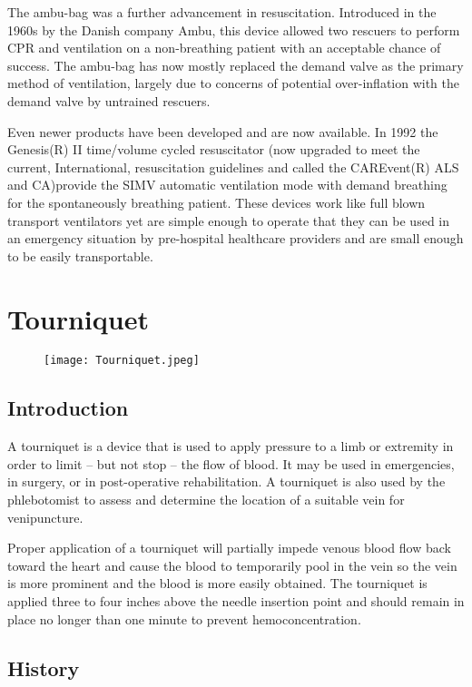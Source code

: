 \documentclass[12pt]{article}
\begin{document}
The ambu-bag was a further advancement in resuscitation. Introduced in the 1960s by the Danish company Ambu, this device allowed two rescuers to perform CPR and ventilation on a non-breathing patient with an acceptable chance of success. The ambu-bag has now mostly replaced the demand valve as the primary method of ventilation, largely due to concerns of potential over-inflation with the demand valve by untrained rescuers.


Even newer products have been developed and are now available. In 1992 the Genesis(R) II time/volume cycled resuscitator (now upgraded to meet the current, International, resuscitation guidelines and called the CAREvent(R) ALS and CA)provide the SIMV automatic ventilation mode with demand breathing for the spontaneously breathing patient. These devices work like full blown transport ventilators yet are simple enough to operate that they can be used in an emergency situation by pre-hospital healthcare providers and are small enough to be easily transportable.


\section{Tourniquet}

\begin{figure}[h]
\texttt{[image: Tourniquet.jpeg]}
\centering
\end{figure}

\subsection{Introduction}

A tourniquet is a device that is used to apply pressure to a limb or extremity in order to limit – but not stop – the flow of blood. It may be used in emergencies, in surgery, or in post-operative rehabilitation. A tourniquet is also used by the phlebotomist to assess and determine the location of a suitable vein for venipuncture.


Proper application of a tourniquet will partially impede venous blood flow back toward the heart and cause the blood to temporarily pool in the vein so the vein is more prominent and the blood is more easily obtained. The tourniquet is applied three to four inches above the needle insertion point and should remain in place no longer than one minute to prevent hemoconcentration.


\subsection{History}
\end{document}
